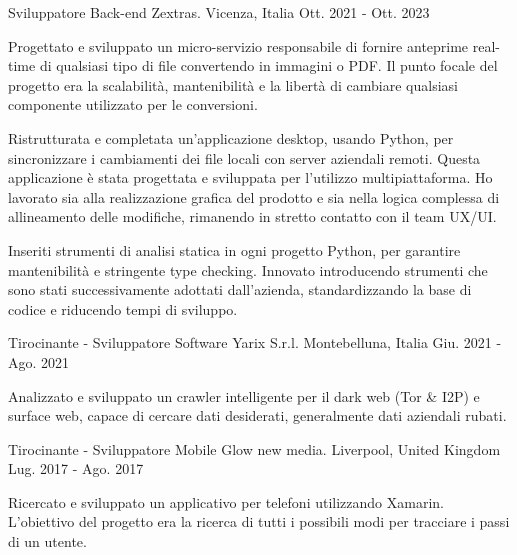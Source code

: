 \begin{cventries}
  \cventry
  {Sviluppatore Back-end} %
  {Zextras.} %
  {Vicenza, Italia} %
  {Ott. 2021 - Ott. 2023} %
  {
    \begin{cvitems} %
    \item {Progettato e sviluppato un micro-servizio responsabile di fornire anteprime real-time di qualsiasi tipo di file convertendo in immagini o PDF. Il punto focale del progetto era la scalabilità, mantenibilità e la libertà di cambiare qualsiasi componente utilizzato per le conversioni.}
    \item {Ristrutturata e completata un'applicazione desktop, usando Python, per sincronizzare i cambiamenti dei file locali con server aziendali remoti. Questa applicazione è stata progettata e sviluppata per l'utilizzo multipiattaforma. Ho lavorato sia alla realizzazione grafica del prodotto e sia nella logica complessa di allineamento delle modifiche, rimanendo in stretto contatto con il team UX/UI.}
    \item {Inseriti strumenti di analisi statica in ogni progetto Python, per garantire mantenibilità e stringente type checking. Innovato introducendo strumenti che sono stati successivamente adottati dall'azienda, standardizzando la base di codice e riducendo tempi di sviluppo.}
    \end{cvitems}
  }

  \cventry
  {Tirocinante - Sviluppatore Software} %
  {Yarix S.r.l.} %
  {Montebelluna, Italia} %
  {Giu. 2021 - Ago. 2021} %
  {
    \begin{cvitems} %
    \item {Analizzato e sviluppato un crawler intelligente per il dark web (Tor \& I2P) e surface web, capace di cercare dati desiderati, generalmente dati aziendali rubati.}
    \end{cvitems}
  }

  \cventry
  {Tirocinante - Sviluppatore Mobile} %
  {Glow new media.} %
  {Liverpool, United Kingdom} %
  {Lug. 2017 - Ago. 2017} %
  {
    \begin{cvitems} %
    \item {Ricercato e sviluppato un applicativo per telefoni utilizzando Xamarin. L'obiettivo del progetto era la ricerca di tutti i possibili modi per tracciare i passi di un utente.}
    \end{cvitems}
  }

\end{cventries}
